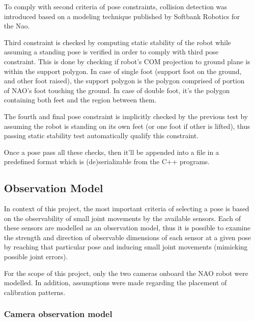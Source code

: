 \documentclass[english, printversion, nomenclature, notitle]{tuvisionthesis} %
\begin{document}
To comply with second criteria of pose constraints, collision detection was introduced based on a modeling technique published by Softbank Robotics for the Nao. 

Third constraint is checked by computing static stability of the robot while assuming a standing pose is verified in order to comply with third pose constraint. This is done by checking if robot's COM projection to ground plane is within the support polygon. In case of single foot (support foot on the ground, and other foot raised), the support polygon is the polygon comprised of portion of NAO's foot touching the ground. In case of double foot, it's the polygon containing both feet and the region between them. 

The fourth and final pose constraint is implicitly checked by the previous test by assuming the robot is standing on its own feet (or one foot if other is lifted), thus passing static stability test automatically qualify this constraint.

Once a pose pass all these checks, then it'll be appended into a file in a predefined format which is (de)serializable from the C++ programs. 

\subsection{Observation Model}
In context of this project, the most important criteria of selecting a pose is based on the observability of small joint movements by the available sensors. Each of these sensors are modelled as an observation model, thus it is possible to examine the strength and direction of observable dimensions of each sensor at a given pose by reaching that particular pose and inducing small joint movements (mimicking possible joint errors).

For the scope of this project, only the two cameras onboard the NAO robot were modelled. In addition, assumptions were made regarding the placement of calibration patterns.

\subsubsection{Camera observation model}
\end{document}
